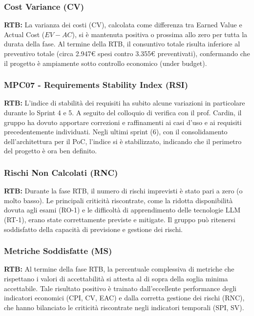 \documentclass[11pt,a4paper]{article}
\begin{document}
\newpage
\subsubsection{Cost Variance (CV)}
\textbf{RTB:} La varianza dei costi (CV), calcolata come differenza tra Earned Value e Actual Cost ($EV - AC$), si è mantenuta positiva o prossima allo zero per tutta la durata della fase. Al termine della RTB, il consuntivo totale risulta inferiore al preventivo totale (circa 2.947€ spesi contro 3.355€ preventivati), confermando che il progetto è ampiamente sotto controllo economico (under budget).

\newpage
\subsubsection{MPC07 - Requirements Stability Index (RSI)}

\textbf{RTB:} L'indice di stabilità dei requisiti ha subito alcune variazioni in particolare durante lo Sprint 4 e 5. A seguito del colloquio di verifica con il prof. Cardin, il gruppo ha dovuto apportare correzioni e raffinamenti ai casi d'uso e ai requisiti precedentemente individuati. Negli ultimi sprint (6), con il consolidamento dell'architettura per il PoC, l'indice si è stabilizzato, indicando che il perimetro del progetto è ora ben definito.

\newpage
\subsubsection{Rischi Non Calcolati (RNC)}

\textbf{RTB:} Durante la fase RTB, il numero di rischi imprevisti è stato pari a zero (o molto basso). Le principali criticità riscontrate, come la ridotta disponibilità dovuta agli esami (RO-1) e le difficoltà di apprendimento delle tecnologie LLM (RT-1), erano state correttamente previste e mitigate. Il gruppo può ritenersi soddisfatto della capacità di previsione e gestione dei rischi.

\newpage
\subsubsection{Metriche Soddisfatte (MS)}
\textbf{RTB:} Al termine della fase RTB, la percentuale complessiva di metriche che rispettano i valori di accettabilità si attesta al di sopra della soglia minima accettabile. Tale risultato positivo è trainato dall'eccellente performance degli indicatori economici (CPI, CV, EAC) e dalla corretta gestione dei rischi (RNC), che hanno bilanciato le criticità riscontrate negli indicatori temporali (SPI, SV).
\end{document}

